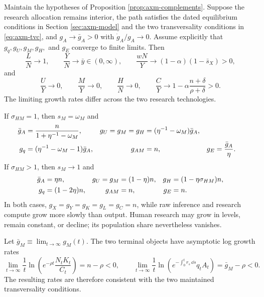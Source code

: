 \begin{proposition}
\label{prop:axm-complements-research}
Maintain the hypotheses of Proposition \ref{prop:axm-complements}. Suppose the
research allocation remains interior, the path satisfies the dated equilibrium
conditions in Section \ref{sec:axm-model} and the two transversality conditions
in \eqref{eq:axm-tvc}, and
\(g_A\to\bar g_A>0\) with \(\dot g_A/g_A\to0\). Assume explicitly that
\(g_q,g_U,g_M,g_H,\) and \(g_E\) converge to finite limits. Then
\begin{equation}
 \frac{L}{N}\to1,\qquad
 \frac{Y}{N}\to\bar y\in(0,\infty),\qquad
 \frac{wN}{Y}\to(1-\alpha)(1-\bar s_X)>0,
 \label{eq:axm-complement-labor-limits}
\end{equation}
and
\begin{equation}
 \frac{U}{Y}\to0,\qquad
 \frac{M}{Y}\to0,\qquad
 \frac{H}{N}\to0,\qquad
 \frac{C}{Y}\to
 1-\alpha\frac{n+\delta}{\rho+\delta}>0.
 \label{eq:axm-complement-vanishing-shares}
\end{equation}
The limiting growth rates differ across the two research technologies.

If \(\sigma_{HM}=1\), then \(s_M=\omega_M\) and
\begin{align}
 \bar g_A&=\frac{n}{1+\eta^{-1}-\omega_M},
 &g_U=g_M=g_H&=(\eta^{-1}-\omega_M)\bar g_A,
 \label{eq:axm-complement-cd-research-growth}\\
 g_q&=(\eta^{-1}-\omega_M-1)\bar g_A,
 &g_{AM}&=n,
 &g_E&=\frac{\bar g_A}{\eta}.
 \notag
\end{align}
If \(\sigma_{HM}>1\), then \(s_M\to1\) and
\begin{align}
 \bar g_A&=\eta n,
 &g_U=g_M&=(1-\eta)n,
 &g_H&=(1-\eta\sigma_{HM})n,
 \label{eq:axm-complement-ces-research-growth}\\
 g_q&=(1-2\eta)n,
 &g_{AM}&=n,
 &g_E&=n.
 \notag
\end{align}
In both cases, \(g_X=g_Y=g_K=g_L=g_C=n\), while raw inference and research
compute grow more slowly than output. Human research may grow in levels, remain
constant, or decline; its population share nevertheless vanishes.

Let
\(\bar g_M\equiv\lim_{t\to\infty}g_M(t)\). The two
terminal objects have asymptotic log growth rates
\begin{equation}
 \lim_{t\to\infty}\frac{1}{t}\ln\left(
 e^{-\rho t}\frac{N_tK_t}{C_t}\right)=n-\rho<0,
 \qquad
 \lim_{t\to\infty}\frac{1}{t}\ln\left(
 e^{-\int_0^t r_s\,\dd s}q_tA_t\right)=\bar g_M-\rho<0.
 \label{eq:axm-complement-tvc-rates}
\end{equation}
The resulting rates are therefore consistent with the two maintained
transversality conditions.
\end{proposition}

